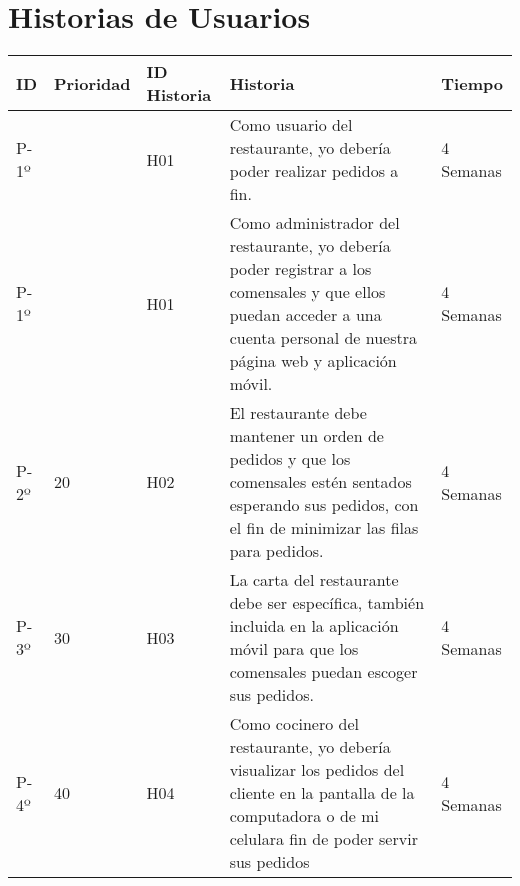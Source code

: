 \chapter{Historias de Usuarios}

\begin{table}[htbp]
	\begin{center}
		\begin{tabular}{| p{0.8cm}|p{2.0cm} | p{2.5 cm} | p{6.0cm}| p{2.0cm} |}
			\hline
			\centering\textbf{ID} & \textbf{Prioridad}& \textbf{ID Historia} & \textbf{Historia} & \textbf{Tiempo}
			
			\\\hline
			P-1º & \centering 10 & H01 &
			
			Como usuario del restaurante, yo debería poder realizar pedidos a fin.
			
			& 4 Semanas
			
			\\\hline
			P-1º & \centering 10 & H01 &
			Como administrador del restaurante, yo debería poder registrar a los comensales y que ellos puedan acceder a una cuenta personal de nuestra página web y aplicación móvil.
			
			& 4 Semanas
			
			\\\hline
			P-2º & 20 & H02 &
			
			El restaurante debe mantener un orden de pedidos y que los comensales estén sentados esperando sus pedidos, con el fin de minimizar las filas para pedidos.
			
			& 4 Semanas
			
			\\\hline
			P-3º & 30 & H03 &
			
			La carta del restaurante debe ser específica, también incluida en la aplicación móvil para que los comensales puedan escoger sus pedidos.
			
			& 4 Semanas
			
			\\\hline
			P-4º & 40 & H04 & 
			
			Como cocinero del restaurante, yo debería visualizar los pedidos del cliente en la pantalla de la computadora o de mi celulara fin de poder servir sus pedidos
			
			& 4 Semanas \\\hline
		\end{tabular}
	\end{center}
\end{table}